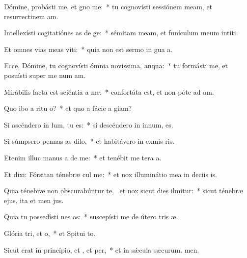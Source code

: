 \item Dómine, probásti me, et gno me:~* tu cognovísti sessiónem meam, et resurrectinem am.
\item Intellexísti cogitatiónes as de ge:~* sémitam meam, et funículum meum intiti.
\item Et omnes vias meas viti:~* quia non est sermo in gua a.
\item Ecce, Dómine, tu cognovísti ómnia novíssima,  anqua:~* tu formásti me, et posuísti super me num am.
\item Mirábilis facta est sciéntia a  me:~* confortáta est, et non póte ad am.
\item Quo ibo a ritu o?~* et quo a fácie a giam?
\item Si ascéndero in lum, tu  es:~* si descéndero in innum, es.
\item Si súmpsero pennas as dilo,~* et habitávero in exmis ris.
\item Etenim illuc manus a de me:~* et tenébit me tera a.
\item Et dixi: Fórsitan ténebræ cul me:~* et nox illuminátio mea in deciis is.
\item Quia ténebræ non obscurabúntur  te,~\pscross{} et nox sicut dies ilmitur:~* sicut ténebræ ejus, ita et men jus.
\item Quia tu possedísti nes os:~* suscepísti me de útero tris æ.
\item Glória tri, et o,~* et Spitui to.
\item Sicut erat in princípio, et , et per,~* et in sǽcula sæcurum. men.

